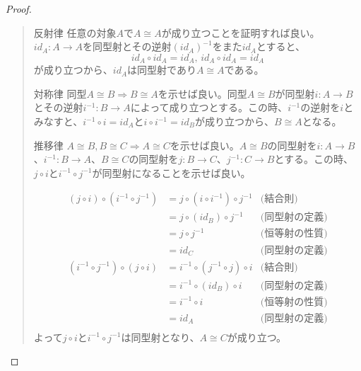 \documentclass[uplatex,dvipdfmx]{jsarticle}
\newcommand{\arrow}{\rightarrow}
\newcommand{\mor}[3]{#1:#2\arrow #3}
\newtheorem{proof}{証明}[section]
\numberwithin{proof}{subsection}
\newenvironment{mydescription}
{\begin{description}
  \setlength{\parskip}{0.5cm}
}
{\end{description}}
\begin{document}
  \begin{proof}~
    \begin{quote}
			\begin{mydescription}
				\item[反射律] 任意の対象$A$で$A\cong A$が成り立つことを証明すれば良い。$\mor{id_A}{A}{A}$を同型射とその逆射$(id_A)^{-1}$をまた$id_A$とすると、\[id_A\circ id_A = id_A,\,id_A\circ id_A = id_A\]が成り立つから、$id_A$は同型射であり$A\cong A$である。

				\item[対称律] 同型$A\cong B\Longrightarrow B\cong A$を示せば良い。同型$A\cong B$が同型射$\mor{i}{A}{B}$とその逆射$\mor{i^{-1}}{B}{A}$によって成り立つとする。この時、$i^{-1}$の逆射を$i$とみなすと、$i^{-1}\circ i=id_A$と$i\circ i^{-1}=id_B$が成り立つから、$B\cong A$となる。
				\item[推移律] $A\cong B,B\cong C\Longrightarrow A\cong C$を示せば良い。$A\cong B$の同型射を$\mor{i}{A}{B}$、$\mor{i^{-1}}{B}{A}$、$B\cong C$の同型射を$\mor{j}{B}{C}$、$\mor{j^{-1}}{C}{B}$とする。この時、$j\circ i$と$i^{-1}\circ j^{-1}$が同型射になることを示せば良い。
        \begin{center}
        \end{center} 
				\begin{align*}
          (j\circ i)\circ (i^{-1}\circ j^{-1})&=j\circ(i\circ i^{-1})\circ j^{-1}&\text{(結合則)}\\
          &=j\circ(id_B)\circ j^{-1}&\text{(同型射の定義)}\\
          &=j\circ j^{-1}&\text{(恒等射の性質)}\\
          &=id_C&\text{(同型射の定義)}\\
          (i^{-1}\circ j^{-1})\circ(j\circ i)&=i^{-1}\circ(j^{-1}\circ j)\circ i&\text{(結合則)}\\
          &=i^{-1}\circ(id_B)\circ i&\text{(同型射の定義)}\\
          &=i^{-1}\circ i&\text{(恒等射の性質)}\\
          &=id_A&\text{(同型射の定義)}\\
        \end{align*}
        よって$j\circ i$と$i^{-1}\circ j^{-1}$は同型射となり、$A\cong C$が成り立つ。
      \end{mydescription}
    \end{quote}
  \end{proof}
\end{document}
